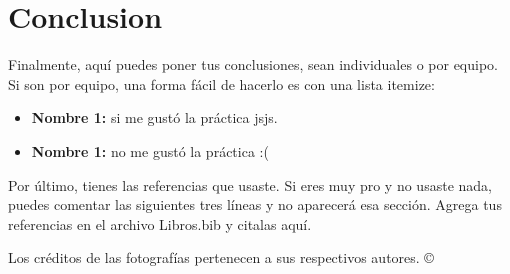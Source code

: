 \documentclass[letterpaper,12pt]{article} %
\begin{document}
\section{Conclusion}
Finalmente, aquí puedes poner tus conclusiones, sean individuales o por equipo. Si son por equipo, una forma fácil de hacerlo es con una lista itemize:

\begin{itemize}
    \item \textbf{Nombre 1:} si me gustó la práctica jsjs.
    
    \item \textbf{Nombre 1:} no me gustó la práctica :(
    
\end{itemize}

Por último, tienes las referencias que usaste. Si eres muy pro y no usaste nada, puedes comentar las siguientes tres líneas y no aparecerá esa sección. Agrega tus referencias en el archivo Libros.bib y citalas aquí.

            \nocite{*}
            
            


\centering \small Los créditos de las fotografías pertenecen a sus respectivos autores. ©

\centering\vspace*{\fill} 
\end{document}
